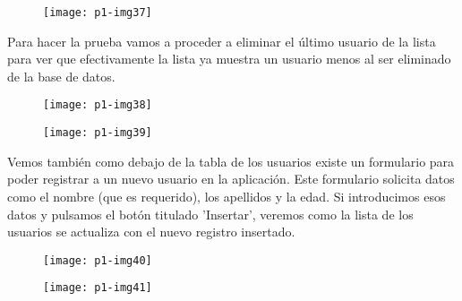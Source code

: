 \documentclass[10pt]{article}
\begin{document}
\begin{figure}[H]
	\begin{center}
 		\texttt{[image: p1-img37]}
	\end{center} 
\end{figure}

Para hacer la prueba vamos a proceder a eliminar el último usuario de la lista para ver que efectivamente la lista ya muestra un usuario menos al ser eliminado de la base de datos.\\

\begin{figure}[H]
	\begin{center}
 		\texttt{[image: p1-img38]}
	\end{center} 
\end{figure}

\begin{figure}[H]
	\begin{center}
 		\texttt{[image: p1-img39]}
	\end{center} 
\end{figure}

Vemos también como debajo de la tabla de los usuarios existe un formulario para poder registrar a un nuevo usuario en la aplicación. Este formulario solicita datos como el nombre (que es requerido), los apellidos y la edad. Si introducimos esos datos y pulsamos el botón titulado 'Insertar', veremos como la lista de los usuarios se actualiza con el nuevo registro insertado. \\

\begin{figure}[H]
	\begin{center}
 		\texttt{[image: p1-img40]}
	\end{center} 
\end{figure}

\begin{figure}[H]
	\begin{center}
 		\texttt{[image: p1-img41]}
	\end{center} 
\end{figure}
\end{document}
